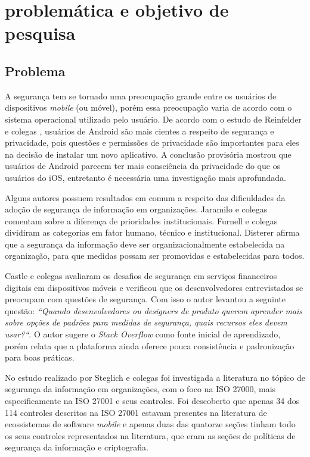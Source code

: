 \chapter{\label{chap:intro}problemática e objetivo de pesquisa}


\section{Problema}

A segurança tem se tornado uma preocupação grande entre os usuários de dispositivos \textit{mobile} (ou móvel), porém essa preocupação varia de acordo com o sistema operacional utilizado pelo usuário. De acordo com o estudo de Reinfelder e colegas \cite{reinfelder2014differences}, usuários de Android são mais cientes a respeito de segurança e  privacidade, pois questões e permissões de privacidade são importantes para eles na decisão de instalar um novo aplicativo. A conclusão provisória mostrou que usuários de Android parecem ter mais consciência da privacidade do que os usuários do iOS, entretanto é necessária uma investigação mais aprofundada.


Alguns autores possuem resultados em comum a respeito das dificuldades da adoção de segurança de informação em organizações. Jaramilo e colegas \cite{jaramillo2013cross} comentam sobre a diferença de prioridades institucionais. Furnell e colegas \cite{furnell2009integrated} dividiram as categorias em fator humano, técnico e institucional. Disterer \cite{disterer2013} afirma que a segurança da informação deve ser organizacionalmente estabelecida na organização, para que medidas possam ser promovidas e estabelecidas para todos.


Castle e colegas \cite{castle2016let} avaliaram os desafios de segurança em serviços financeiros digitais em dispositivos móveis e verificou que os desenvolvedores entrevistados se preocupam com questões de segurança. Com isso o autor levantou a seguinte questão: \textit{“Quando desenvolvedores ou designers de produto querem aprender mais sobre opções de padrões para medidas de segurança, quais recursos eles devem usar?“}. O autor sugere o \textit{Stack Overflow} como fonte inicial de aprendizado, porém relata que a plataforma ainda oferece pouca consistência e padronização para boas práticas.

No estudo realizado por Steglich e colegas  \cite{caio2019} foi investigada a literatura no tópico de segurança da informação em organizações, com o foco na ISO 27000, mais especificamente na ISO 27001 e seus controles. Foi descoberto que apenas 34 dos 114 controles descritos na ISO 27001 estavam presentes na literatura de ecossistemas de software \textit{mobile} e apenas duas das quatorze seções tinham todo os seus controles representados na literatura, que eram as seções de políticas de segurança da informação e criptografia.  

